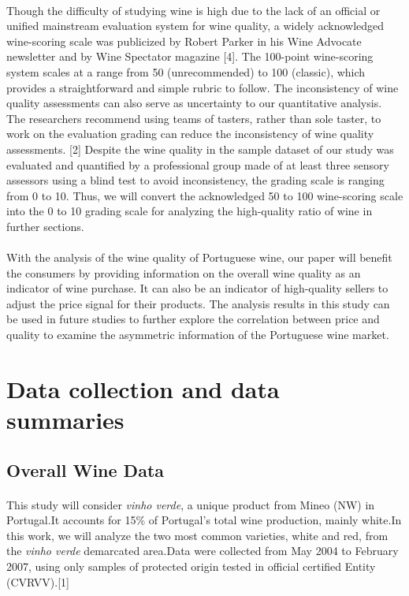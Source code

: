 \documentclass{article}
\begin{document}
\paragraph{}
Though the difficulty of studying wine is high due to the lack of an official or unified mainstream evaluation system for wine quality, a widely acknowledged wine-scoring scale was publicized by Robert Parker in his Wine Advocate newsletter and by Wine Spectator magazine [4]. The 100-point wine-scoring system scales at a range from 50 (unrecommended) to 100 (classic), which provides a straightforward and simple rubric to follow. The inconsistency of wine quality assessments can also serve as uncertainty to our quantitative analysis. The researchers recommend using teams of tasters, rather than sole taster, to work on the evaluation grading can reduce the inconsistency of wine quality assessments. [2] Despite the wine quality in the sample dataset of our study was evaluated and quantified by a professional group made of at least three sensory assessors using a blind test to avoid inconsistency, the grading scale is ranging from 0 to 10. Thus, we will convert the acknowledged 50 to 100 wine-scoring scale into the 0 to 10 grading scale for analyzing the high-quality ratio of wine in further sections.
\paragraph{}
With the analysis of the wine quality of Portuguese wine, our paper will benefit the consumers by providing information on the overall wine quality as an indicator of wine purchase. It can also be an indicator of high-quality sellers to adjust the price signal for their products. The analysis results in this study can be used in future studies to further explore the correlation between price and quality to examine the asymmetric information of the Portuguese wine market. 
\section{Data collection and data summaries}
\subsection{Overall Wine Data}
\paragraph{}
This study will consider \textit{vinho verde}, a unique product from Mineo (NW) in Portugal.It accounts for 15\% of Portugal's total wine production, mainly white.In this work, we will analyze the two most common varieties, white and red, from the \textit{vinho verde} demarcated area.Data were collected from May 2004 to February 2007, using only samples of protected origin tested in official certified Entity (CVRVV).[1]
\end{document}
